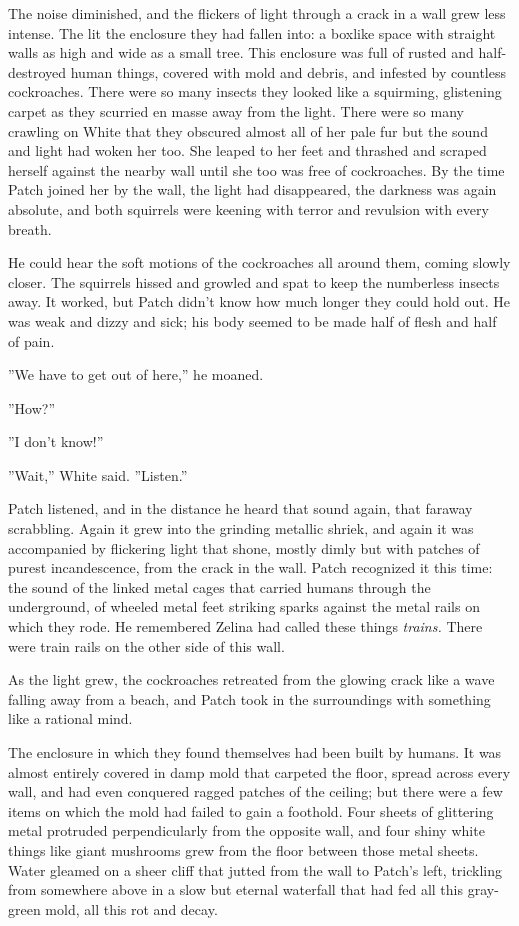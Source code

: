 \documentclass[11pt]{article}
\begin{document}
 The noise diminished, and the flickers of light through a crack in a wall grew less intense. The lit the enclosure they had fallen into: a boxlike space with straight walls as high and wide as a small tree. This enclosure was full of rusted and half-destroyed human things, covered with mold and debris, and infested by countless cockroaches. There were so many insects they looked like a squirming, glistening carpet as they scurried en masse away from the light. There were so many crawling on White that they obscured almost all of her pale fur %
 but the sound and light had woken her too. She leaped to her feet and thrashed and scraped herself against the nearby wall until she too was free of cockroaches. By the time Patch joined her by the wall, the light had disappeared, the darkness was again absolute, and both squirrels were keening with terror and revulsion with every breath.\par
 He could hear the soft motions of the cockroaches all around them, coming slowly closer. The squirrels hissed and growled and spat to keep the numberless insects away. It worked, but Patch didn't know how much longer they could hold out. He was weak and dizzy and sick; his body seemed to be made half of flesh and half of pain.\par
 ''We have to get out of here,'' he moaned.\par
 ''How?''\par
 ''I don't know!''\par
 ''Wait,'' White said. ''Listen.''\par
 Patch listened, and in the distance he heard that sound again, that faraway scrabbling. Again it grew into the grinding metallic shriek, and again it was accompanied by flickering light that shone, mostly dimly but with patches of purest incandescence, from the crack in the wall. Patch recognized it this time: the sound of the linked metal cages that carried humans through the underground, of wheeled metal feet striking sparks against the metal rails on which they rode. He remembered Zelina had called these things {\it trains.} There were train rails on the other side of this wall.\par
 As the light grew, the cockroaches retreated from the glowing crack like a wave falling away from a beach, and Patch took in the surroundings with something like a rational mind.\par
The enclosure in which they found themselves had been built by humans. It was almost entirely covered in damp mold that carpeted the floor, spread across every wall, and had even conquered ragged patches of the ceiling; but there were a few items on which the mold had failed to gain a foothold. Four sheets of glittering metal protruded perpendicularly from the opposite wall, and four shiny white things like giant mushrooms grew from the floor between those metal sheets. Water gleamed on a sheer cliff that jutted from the wall to Patch's left, trickling from somewhere above in a slow but eternal waterfall that had fed all this gray-green mold, all this rot and decay.\par
\end{document}
